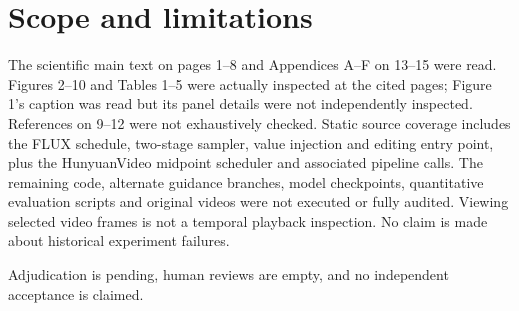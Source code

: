 \documentclass[10pt]{article}
\begin{document}
\section*{Scope and limitations}
The scientific main text on pages 1–8 and Appendices A–F on 13–15 were read. Figures 2–10 and Tables 1–5 were actually inspected at the cited pages; Figure 1’s caption was read but its panel details were not independently inspected. References on 9–12 were not exhaustively checked. Static source coverage includes the FLUX schedule, two-stage sampler, value injection and editing entry point, plus the HunyuanVideo midpoint scheduler and associated pipeline calls. The remaining code, alternate guidance branches, model checkpoints, quantitative evaluation scripts and original videos were not executed or fully audited. Viewing selected video frames is not a temporal playback inspection. No claim is made about historical experiment failures.\par
Adjudication is pending, human reviews are empty, and no independent acceptance is claimed.\par
\end{document}
